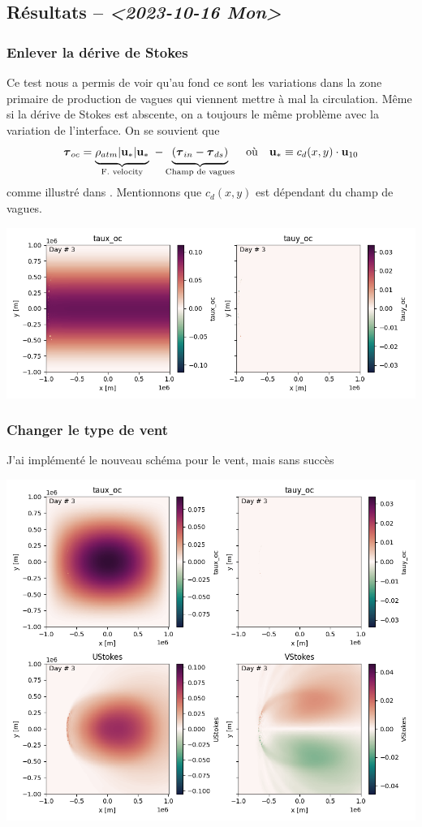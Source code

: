 \documentclass[10pt]{article}
\numberwithin{equation}{section}
\newcommand{\uu}{\vb{u}}
\newcommand{\tall}{\vphantom{pA^{x^x}_p}}
\begin{document}
\newpage
\subsection{Résultats -- \textit{<2023-10-16 Mon>}}
\label{sec:org04deaab}

\subsubsection{Enlever la dérive de Stokes}
\label{sec:orgd57bc15}
Ce test nous a permis de voir qu'au fond ce sont les variations dans la zone primaire de production de vagues qui viennent mettre à mal la circulation.
Même si la dérive de Stokes est abscente, on a toujours le même problème avec la variation de l'interface.
On se souvient que
\begin{align}
   && \boldsymbol{\tau}_{oc} = \underbrace{\rho_{atm} |\uu_*|\uu_*\tall}_\text{F. velocity} \ - \underbrace{\qty(\boldsymbol{\tau}_{in} - \boldsymbol{\tau}_{ds})\tall}_\text{Champ de vagues} && \text{où} && \uu_* \equiv c_d(x,y)\cdot\uu_{10} &&
\end{align}
comme illustré dans \autocite{breivik_al_2015}.
Mentionnons que \(c_d(x,y)\) est dépendant du champ de vagues. 
\begin{center}
\includegraphics[width=.9\linewidth]{figures/debuggage/2023_10_16_nostokes_tauoc.png}
\end{center}
\subsubsection{Changer le type de vent}
\label{sec:org64dcd81}
J'ai implémenté le nouveau schéma pour le vent, mais sans succès

\begin{center}
\includegraphics[width=.9\linewidth]{figures/debuggage/2023_10_16_ramp_tauETUstokes.png}
\end{center}



\printbibliography
\end{document}
